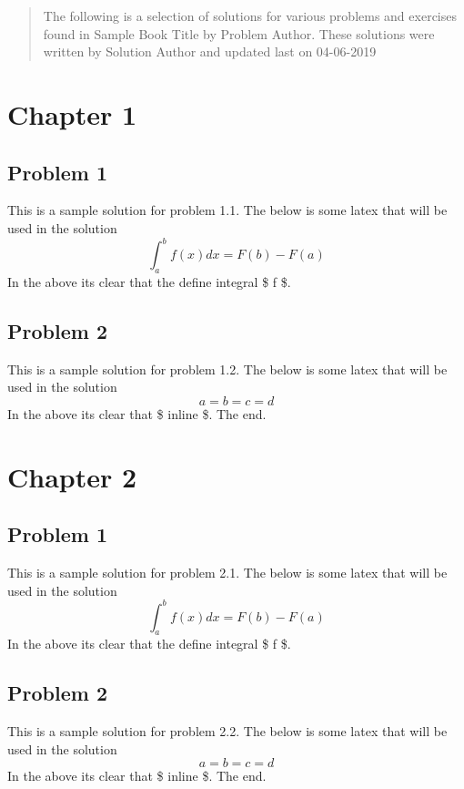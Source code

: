 \documentclass[12pt]{article}
\begin{document}
\maketitle

\begin{abstract}
The following is a selection of solutions for various problems and exercises found 
in Sample Book Title by Problem Author. These solutions were written by Solution Author and updated 
last on 04-06-2019
\end{abstract}

\tableofcontents
\newpage

\section{ Chapter 1 }
\subsection{ Problem 1 }
This is a sample solution for problem 1.1. The below is some latex that
will be used in the solution \[ \int_{a}^b f(x) dx = F(b) - F(a) \] In
the above its clear that the define integral \$ f \$.


\subsection{ Problem 2 }
This is a sample solution for problem 1.2. The below is some latex that
will be used in the solution \[ a = b = c = d \] In the above its clear
that \$ inline \$. The end.


\section{ Chapter 2 }
\subsection{ Problem 1 }
This is a sample solution for problem 2.1. The below is some latex that
will be used in the solution \[ \int_{a}^b f(x) dx = F(b) - F(a) \] In
the above its clear that the define integral \$ f \$.


\subsection{ Problem 2 }
This is a sample solution for problem 2.2. The below is some latex that
will be used in the solution \[ a = b = c = d \] In the above its clear
that \$ inline \$. The end.
\end{document}
